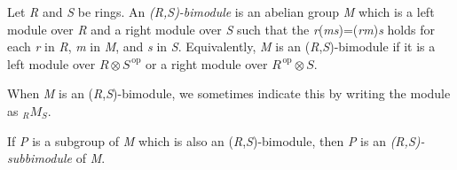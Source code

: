 \documentclass{article}
\newcommand{\opposite}[1]{{#1}^{\,\mathrm{op}}}
\newcommand{\fm}[1]{{\it #1}}
\begin{document}
Let \fm{R} and \fm{S} be rings.  An \emph{(\fm{R},\fm{S})-bimodule} is
an abelian group \fm{M} which is a left module over \fm{R} and a right
module over \fm{S} such that the \fm{r}(\fm{ms})=(\fm{rm})\fm{s} holds
for each \fm{r} in \fm{R}, \fm{m} in \fm{M}, and \fm{s} in \fm{S}.
Equivalently, \fm{M} is an (\fm{R},\fm{S})-bimodule if it is a left
module over $R\otimes\opposite{S}$ or a right module over
$\opposite{R}\otimes S$.

When \fm{M} is an (\fm{R},\fm{S})-bimodule, we sometimes indicate this
by writing the module as ${}_RM_S$.

If \fm{P} is a subgroup of \fm{M} which is also an
(\fm{R},\fm{S})-bimodule, then \fm{P} is an
\emph{(\fm{R},\fm{S})-subbimodule} of \fm{M}.
\end{document}
